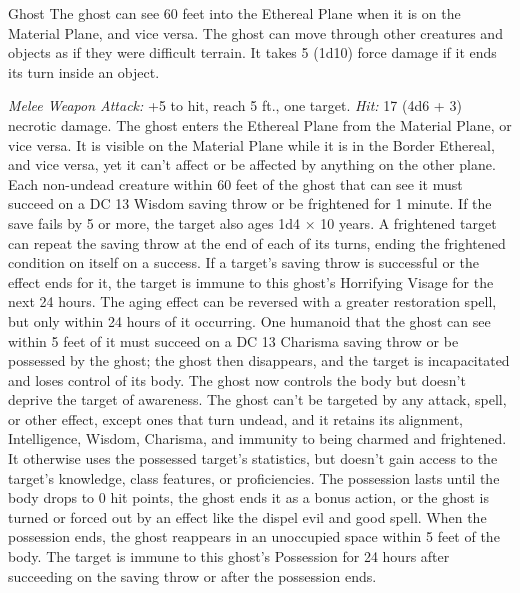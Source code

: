 \documentclass[10pt,a4paper,twoside,bg=print,twocolumn,openany,nodeprecatedcode]{dndbook}
\begin{document}
\begin{DndMonster}[float=ht]{Ghost}
\DndMonsterBasics[
armor-class = {11},
hit-points = {\DndDice{10d8}},
speed = {0 ft., fly 40 ft. (hover)}
]
\DndMonsterAbilityScores[
 str = 7,
 dex = 13,
 con = 10,
 int = 10,
 wis = 12,
 cha = 17
]
\DndMonsterDetails[
damage-resistances = {acid, fire, lightning, thunder; bludgeoning, piercing, slashing from nonmagical attacks},
damage-immunities = {cold, necrotic, poison},
senses = {darkvision 60 ft., passive perception 11},
languages = {any languages it knew in life},
challenge = 4,
]
The ghost can see 60 feet into the Ethereal Plane when it is on the Material Plane, and vice versa.
The ghost can move through other creatures and objects as if they were difficult terrain. It takes 5 (1d10) force damage if it ends its turn inside an object.
\par
{}
\textsl{Melee Weapon Attack:} +5 to hit, reach 5 ft., one target. \textsl{Hit:} 17 (4d6 + 3) necrotic damage.
The ghost enters the Ethereal Plane from the Material Plane, or vice versa. It is visible on the Material Plane while it is in the Border Ethereal, and vice versa, yet it can't affect or be affected by anything on the other plane.
Each non-undead creature within 60 feet of the ghost that can see it must succeed on a DC 13 Wisdom saving throw or be frightened for 1 minute. If the save fails by 5 or more, the target also ages 1d4 × 10 years. A frightened target can repeat the saving throw at the end of each of its turns, ending the frightened condition on itself on a success. If a target's saving throw is successful or the effect ends for it, the target is immune to this ghost's Horrifying Visage for the next 24 hours. The aging effect can be reversed with a  greater restoration spell, but only within 24 hours of it occurring.
One humanoid that the ghost can see within 5 feet of it must succeed on a DC 13 Charisma saving throw or be possessed by the ghost; the ghost then disappears, and the target is incapacitated and loses control of its body. The ghost now controls the body but doesn't deprive the target of awareness. The ghost can't be targeted by any attack, spell, or other effect, except ones that turn undead, and it retains its alignment, Intelligence, Wisdom, Charisma, and immunity to being charmed and frightened. It otherwise uses the possessed target's statistics, but doesn't gain access to the target's knowledge, class features, or proficiencies.
The possession lasts until the body drops to 0 hit points, the ghost ends it as a bonus action, or the ghost is turned or forced out by an effect like the dispel evil and good spell. When the possession ends, the ghost reappears in an unoccupied space within 5 feet of the body. The target is immune to this ghost's Possession for 24 hours after succeeding on the saving throw or after the possession ends.
\end{DndMonster}
\end{document}
